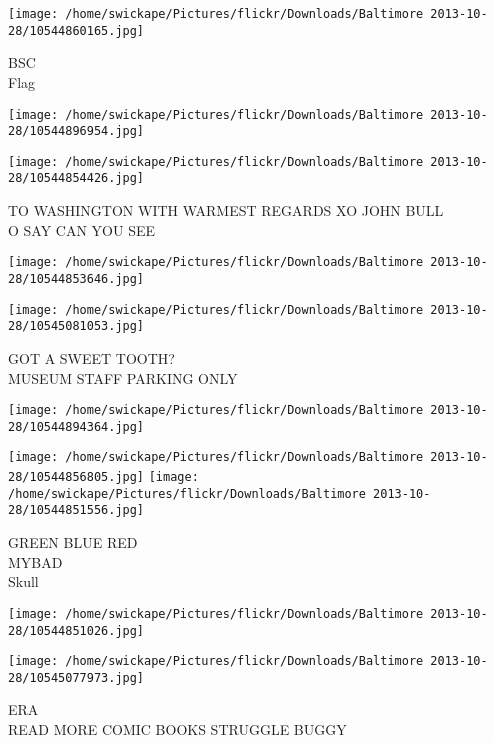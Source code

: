 \documentclass[10pt,letterpaper]{article}
\begin{document}
\vspace{0.25in}
\texttt{[image: /home/swickape/Pictures/flickr/Downloads/Baltimore 2013-10-28/10544860165.jpg]}

BSC\\
Flag\\
\pagebreak

\texttt{[image: /home/swickape/Pictures/flickr/Downloads/Baltimore 2013-10-28/10544896954.jpg]}

\vspace{0.25in}
\texttt{[image: /home/swickape/Pictures/flickr/Downloads/Baltimore 2013-10-28/10544854426.jpg]}

TO WASHINGTON WITH WARMEST REGARDS XO JOHN BULL\\
O SAY CAN YOU SEE\\
\pagebreak

\texttt{[image: /home/swickape/Pictures/flickr/Downloads/Baltimore 2013-10-28/10544853646.jpg]}

\vspace{0.25in}
\texttt{[image: /home/swickape/Pictures/flickr/Downloads/Baltimore 2013-10-28/10545081053.jpg]}

GOT A SWEET TOOTH?\\
MUSEUM STAFF PARKING ONLY\\
\pagebreak

\texttt{[image: /home/swickape/Pictures/flickr/Downloads/Baltimore 2013-10-28/10544894364.jpg]}

\vspace{0.25in}
\texttt{[image: /home/swickape/Pictures/flickr/Downloads/Baltimore 2013-10-28/10544856805.jpg]}
\texttt{[image: /home/swickape/Pictures/flickr/Downloads/Baltimore 2013-10-28/10544851556.jpg]}

GREEN BLUE RED\\
MYBAD\\
Skull\\
\pagebreak

\texttt{[image: /home/swickape/Pictures/flickr/Downloads/Baltimore 2013-10-28/10544851026.jpg]}

\vspace{0.25in}
\texttt{[image: /home/swickape/Pictures/flickr/Downloads/Baltimore 2013-10-28/10545077973.jpg]}

ERA\\
READ MORE COMIC BOOKS STRUGGLE BUGGY\\
\pagebreak
\end{document}
